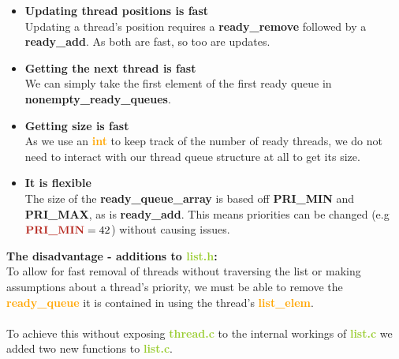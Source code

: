 \documentclass{report}
\newcommand{\bullpara}[2]{\item \textbf{#1} \ #2}
\newcommand{\fun}[1]{\textcolor{Emerald}{\textbf{#1}}}
\newcommand{\file}[1]{\textcolor{YellowGreen}{\textbf{#1}}}
\newcommand{\struct}[1]{\textcolor{orange}{\textbf{#1}}}
\newcommand{\var}[1]{\textcolor{RoyalPurple}{\textbf{#1}}}
\newcommand{\const}[1]{\textcolor{BrickRed}{\textbf{#1}}}
\newcommand{\pintoscode}[4]{}
\begin{document}
\begin{itemize}
{                    }
                    \bullpara{Updating thread positions is fast}{
                        \\ Updating a thread's position requires a \fun{ready\_remove} followed by a \fun{ready\_add}. As
                         both are fast, so too are updates.
                    }
                    \bullpara{Getting the next thread is fast}{
                        \\ We can simply take the first element of the first ready queue in \var{nonempty\_ready\_queues}.
                    }
                    \bullpara{Getting size is fast}{
                        \\ As we use an \struct{int} to keep track of the number of ready threads, we do not need to interact 
                        with our thread queue structure at all to get its size.
                    }
                    \bullpara{It is flexible}{
                        \\ The size of the \var{ready\_queue\_array} is based off \const{PRI\_MIN} and \const{PRI\_MAX}, 
                        as is \fun{ready\_add}. This means priorities can be changed (e.g $\text{\const{PRI\_MIN}} = 42$) 
                        without causing issues.
                    }
                \end{itemize}
                \textbf{The disadvantage - additions to \file{list.h}:}
                \\ To allow for fast removal of threads without traversing the list or making assumptions about a thread's 
                priority, we must be able to remove the \struct{ready\_queue} it is contained in using the thread's 
                \struct{list\_elem}. 
                \\ \\ To achieve this without exposing \file{thread.c} to the internal workings of \file{list.c} we added 
                two new functions to \file{list.c}. 
                \pintoscode{316}{320}{list.c}{../lib/kernel/list.c}
                \pintoscode{288}{295}{list.c}{../lib/kernel/list.c}
\end{document}
